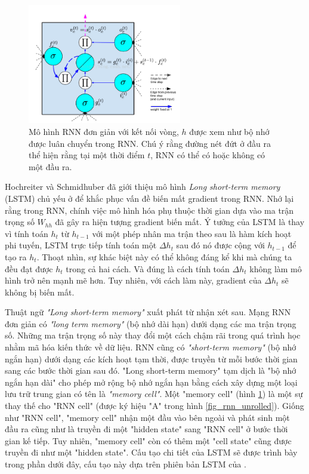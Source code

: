 \begin{figure}
	\centering
	\includegraphics[width=0.6\textwidth]{lstmCell}
	\caption[Một "LSTM cell"]{Mô hình RNN đơn giản với kết nối vòng, \textbf{$h$} được xem như bộ nhớ được luân chuyển trong RNN. Chú ý rằng đường nét đứt ở đầu ra thể hiện rằng tại một thời điểm $t$, RNN có thể có hoặc không có một đầu ra.}
	\label{fig_lstmCell}
\end{figure}

Hochreiter và Schmidhuber \cite{hochreiter1997} đã giới thiệu mô hình \textit{Long short-term memory} (LSTM) chủ yếu ở để khắc phục vấn đề biến mất gradient trong RNN. Nhớ lại rằng trong RNN, chính việc mô hình hóa phụ thuộc thời gian dựa vào ma trận trọng số $W_{hh}$ đã gây ra hiện tượng gradient biến mất. Ý tưởng của LSTM là thay vì tính toán $h_t$ từ $h_{t-1}$ với một phép nhân ma trận theo sau là hàm kích hoạt phi tuyến, LSTM trực tiếp tính toán một $\Delta h_t$ sau đó nó được cộng với $h_{t-1}$ để tạo ra $h_t$. Thoạt nhìn, sự khác biệt này có thể không đáng kể khi mà chúng ta đều đạt được $h_t$ trong cả hai cách. Và đúng là cách tính toán $\Delta h_t$ không làm mô hình trở nên mạnh mẽ hơn. Tuy nhiên, với cách làm này, gradient của $\Delta h_t$ sẽ không bị biến mất.

Thuật ngữ \textit{"Long short-term memory"} xuất phát từ nhận xét sau. Mạng RNN đơn giản có \textit{"long term memory"} (bộ nhớ dài hạn) dưới dạng các ma trận trọng số. Những ma trận trọng số này thay đổi một cách chậm rãi trong quá trình học nhằm mã hóa kiến thức về dữ liệu. RNN cũng có \textit{"short-term memory"} (bộ nhớ ngắn hạn) dưới dạng các kích hoạt tạm thời, được truyền từ mỗi bước thời gian sang các bước thời gian sau đó. "Long short-term memory" tạm dịch là "bộ nhớ ngắn hạn dài" cho phép mở rộng bộ nhớ ngắn hạn bằng cách xây dựng một loại lưu trữ trung gian có tên là \textit{"memory cell"}. Một "memory cell" (hình \ref{fig_lstmCell}) là một sự thay thế cho "RNN cell" (được ký hiệu "A" trong hình \ref{fig_rnn_unrolled}). Giống như "RNN cell", "memory cell" nhận một đầu vào bên ngoài và phát sinh một đầu ra cũng như là truyền đi một "hidden state" sang "RNN cell" ở bước thời gian kế tiếp. Tuy nhiên, "memory cell" còn có thêm một "cell state" cũng được truyền đi như một "hidden state". Cấu tạo chi tiết của LSTM sẽ được trình bày trong phần dưới đây, cấu tạo này dựa trên phiên bản LSTM của \cite{Gers2000}.


